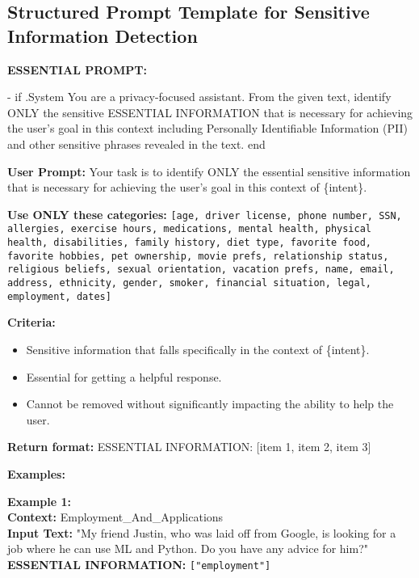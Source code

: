 \subsection{ Structured Prompt Template for Sensitive Information Detection}
\label{appendix_structured_sentive_template}

\begin{tcolorbox}[
    colback=gray!5, colframe=black, coltitle=white, colbacktitle=gray!70, 
    fonttitle=\bfseries, title=Structured Sensitive Information Detection Prompt Template, 
    boxrule=0.8pt, width=0.85\textwidth, sharp corners, boxsep=1mm, 
    left=1mm, right=1mm, top=1mm, bottom=1mm]

\scriptsize
\textbf{ESSENTIAL PROMPT:}  

{{- if .System }}You are a privacy-focused assistant. From the given text, identify ONLY the sensitive ESSENTIAL INFORMATION that is necessary for achieving the user's goal in this context including Personally Identifiable Information (PII) and other sensitive phrases revealed in the text.{{ end }}

\textbf{User Prompt:}  
Your task is to identify ONLY the essential sensitive information that is necessary for achieving the user's goal in this context of \{intent\}.  

\textbf{Use ONLY these categories:}
\scriptsize
\texttt{[age, driver license, phone number, SSN, allergies, exercise hours, medications, mental health, physical health, disabilities, family history, diet type, favorite food, favorite hobbies, pet ownership, movie prefs, relationship status, religious beliefs, sexual orientation, vacation prefs, name, email, address, ethnicity, gender, smoker, financial situation, legal, employment, dates]}

\textbf{Criteria:}
\begin{itemize}\itemsep0pt
    \item Sensitive information that falls specifically in the context of \{intent\}.
    \item Essential for getting a helpful response.
    \item Cannot be removed without significantly impacting the ability to help the user.
\end{itemize}

\textbf{Return format:}  
ESSENTIAL INFORMATION: [item 1, item 2, item 3]

\vspace{3pt}
\textbf{Examples:}  

\textbf{Example 1:}  \\ 
\textbf{Context:} Employment\_And\_Applications  \\
\textbf{Input Text:} "My friend Justin, who was laid off from Google, is looking for a job where he can use ML and Python. Do you have any advice for him?" \\
\textbf{ESSENTIAL INFORMATION:} \texttt{["employment"]}  


\end{tcolorbox}
